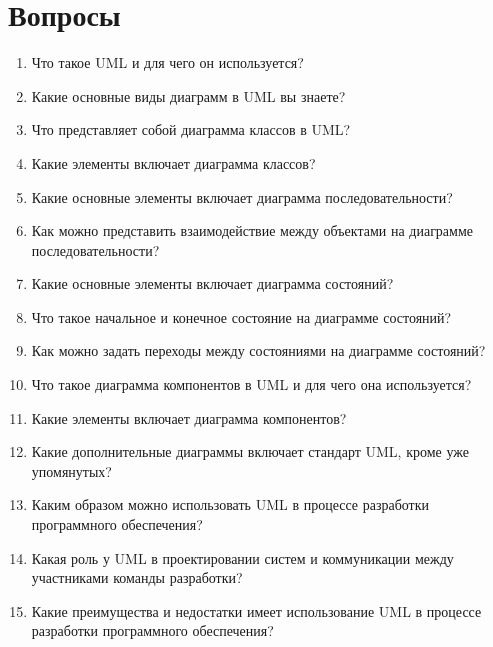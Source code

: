 \documentclass[letterpaper,10pt,russian]{sphinxmanual}
\begin{document}
\sphinxstepscope


\section{Вопросы}
\label{\detokenize{educational_materials/uml/quiz:id1}}\label{\detokenize{educational_materials/uml/quiz::doc}}\begin{enumerate}
%
\item {} 
\sphinxAtStartPar
Что такое UML и для чего он используется?

\item {} 
\sphinxAtStartPar
Какие основные виды диаграмм в UML вы знаете?

\item {} 
\sphinxAtStartPar
Что представляет собой диаграмма классов в UML?

\item {} 
\sphinxAtStartPar
Какие элементы включает диаграмма классов?

\item {} 
\sphinxAtStartPar
Какие основные элементы включает диаграмма последовательности?

\item {} 
\sphinxAtStartPar
Как можно представить взаимодействие между объектами на диаграмме последовательности?

\item {} 
\sphinxAtStartPar
Какие основные элементы включает диаграмма состояний?

\item {} 
\sphinxAtStartPar
Что такое начальное и конечное состояние на диаграмме состояний?

\item {} 
\sphinxAtStartPar
Как можно задать переходы между состояниями на диаграмме состояний?

\item {} 
\sphinxAtStartPar
Что такое диаграмма компонентов в UML и для чего она используется?

\item {} 
\sphinxAtStartPar
Какие элементы включает диаграмма компонентов?

\item {} 
\sphinxAtStartPar
Какие дополнительные диаграммы включает стандарт UML, кроме уже упомянутых?

\item {} 
\sphinxAtStartPar
Каким образом можно использовать UML в процессе разработки программного обеспечения?

\item {} 
\sphinxAtStartPar
Какая роль у UML в проектировании систем и коммуникации между участниками команды разработки?

\item {} 
\sphinxAtStartPar
Какие преимущества и недостатки имеет использование UML в процессе разработки программного обеспечения?

\end{enumerate}
\end{document}
